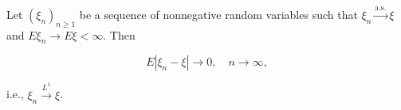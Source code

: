 Let $(\xi_n)_{n \geq 1}$ be a sequence of nonnegative random variables such that $\xi_n \xrightarrow{\text{a.s.}} \xi$ and $E\xi_n \to E\xi < \infty$. Then

$$E|\xi_n - \xi| \to 0, \quad n \to \infty,$$

i.e., $\xi_n \xrightarrow{L^1} \xi$.
